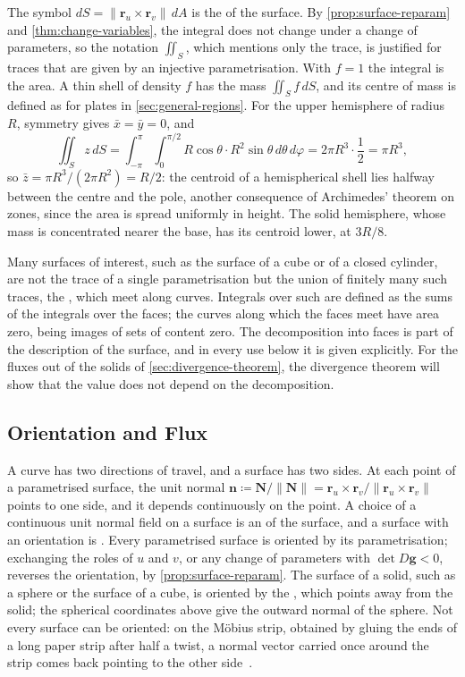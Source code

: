 The symbol $dS=\|\mathbf r_u\times\mathbf r_v\|\,dA$ is the  of the surface. By \cref{prop:surface-reparam} and \cref{thm:change-variables}, the integral does not change under a change of parameters, so the notation $\iint_S$, which mentions only the trace, is justified for traces that are given by an injective parametrisation. With $f=1$ the integral is the area. A thin shell of density $f$ has the mass $\iint_Sf\,dS$, and its centre of mass is defined as for plates in \cref{sec:general-regions}. For the upper hemisphere of radius $R$, symmetry gives $\bar x=\bar y=0$, and
\[
\iint_Sz\,dS=\int_{-\pi}^\pi\int_0^{\pi/2}R\cos\theta\cdot R^2\sin\theta\,d\theta\,d\varphi=2\pi R^3\cdot\frac12=\pi R^3 ,
\]
so $\bar z=\pi R^3/(2\pi R^2)=R/2$: the centroid of a hemispherical shell lies halfway between the centre and the pole, another consequence of Archimedes' theorem on zones, since the area is spread uniformly in height. The solid hemisphere, whose mass is concentrated nearer the base, has its centroid lower, at $3R/8$.

Many surfaces of interest, such as the surface of a cube or of a closed cylinder, are not the trace of a single parametrisation but the union of finitely many such traces, the , which meet along curves. Integrals over such  are defined as the sums of the integrals over the faces; the curves along which the faces meet have area zero, being images of sets of content zero. The decomposition into faces is part of the description of the surface, and in every use below it is given explicitly. For the fluxes out of the solids of \cref{sec:divergence-theorem}, the divergence theorem will show that the value does not depend on the decomposition.

\subsection{Orientation and Flux}

A curve has two directions of travel, and a surface has two sides. At each point of a parametrised surface, the unit normal $\mathbf n\coloneqq\mathbf N/\|\mathbf N\|=\mathbf r_u\times\mathbf r_v/\|\mathbf r_u\times\mathbf r_v\|$ points to one side, and it depends continuously on the point. A choice of a continuous unit normal field on a surface is an  of the surface, and a surface with an orientation is . Every parametrised surface is oriented by its parametrisation; exchanging the roles of $u$ and $v$, or any change of parameters with $\det D\mathbf g<0$, reverses the orientation, by \cref{prop:surface-reparam}. The surface of a solid, such as a sphere or the surface of a cube, is oriented by the , which points away from the solid; the spherical coordinates above give the outward normal of the sphere. Not every surface can be oriented: on the M\"obius strip, obtained by gluing the ends of a long paper strip after half a twist, a normal vector carried once around the strip comes back pointing to the other side~\cite{docarmo1976}.

